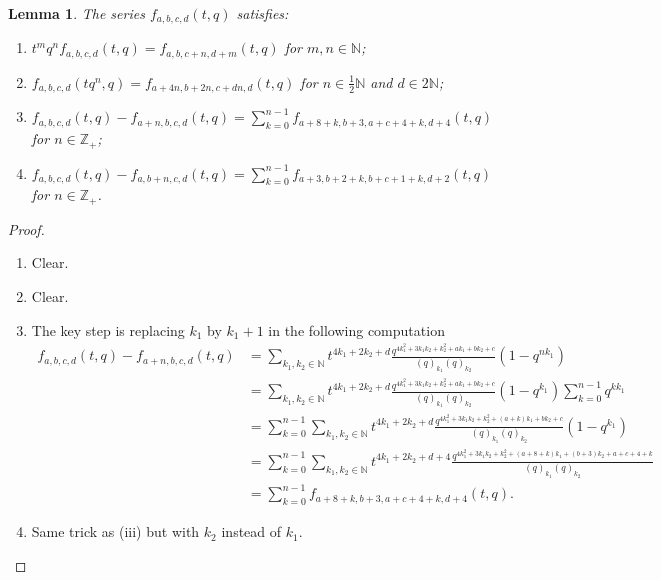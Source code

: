 \documentclass[a4paper, 12pt, reqno]{amsart}
\newtheorem{lemma}[theorem]{Lemma}
\theoremstyle{remark}
\begin{document}
\begin{lemma}
  \label{lmm:28}
  The series $f_{a, b, c, d}(t, q)$ satisfies:
  \begin{enumerate}
  \item $t^mq^nf_{a, b, c, d}(t, q) = f_{a, b, c + n, d + m}(t, q)$ for $m, n \in \mathbb{N}$;
  \item $f_{a, b, c, d}(tq^n, q) = f_{a + 4n, b + 2n, c + dn, d}(t, q)$ for $n \in \frac{1}{2}\mathbb{N}$ and $d \in 2\mathbb{N}$;
  \item $f_{a, b, c, d}(t, q) - f_{a + n, b, c, d}(t, q) = \sum_{k = 0}^{n - 1}f_{a + 8 + k, b + 3, a + c + 4 + k, d + 4}(t, q)$ for $n \in \mathbb{Z}_+$;
  \item $f_{a, b, c, d}(t, q) - f_{a, b + n, c, d}(t, q) = \sum_{k = 0}^{n - 1}f_{a + 3, b + 2 + k, b + c + 1 + k, d + 2}(t, q)$ for $n \in \mathbb{Z}_+$.
  \end{enumerate}
\end{lemma}

\begin{proof}\leavevmode
  \begin{enumerate}
  \item Clear.
  \item Clear.
  \item The key step is replacing $k_1$ by $k_1 + 1$ in the following computation
    \begin{align*}
      f_{a, b, c, d}(t, q) - f_{a + n, b, c, d}(t, q) &= \sum_{k_1, k_2 \in \mathbb{N}}t^{4k_1 + 2k_2 + d}\frac{q^{4k_1^2 + 3k_1k_2 + k_2^2 + ak_1 + bk_2 + c}}{(q)_{k_1}(q)_{k_2}}(1 - q^{nk_1}) \\
                                                      &= \sum_{k_1, k_2 \in \mathbb{N}}t^{4k_1 + 2k_2 + d}\frac{q^{4k_1^2 + 3k_1k_2 + k_2^2 + ak_1 + bk_2 + c}}{(q)_{k_1}(q)_{k_2}}(1 - q^{k_1})\sum_{k = 0}^{n - 1}q^{kk_1} \\
                                                      &= \sum_{k = 0}^{n - 1}\sum_{k_1, k_2 \in \mathbb{N}}t^{4k_1 + 2k_2 + d}\frac{q^{4k_1^2 + 3k_1k_2 + k_2^2 + (a + k)k_1 + bk_2 + c}}{(q)_{k_1}(q)_{k_2}}(1 - q^{k_1}) \\
                                                      &= \sum_{k = 0}^{n - 1}\sum_{k_1, k_2 \in \mathbb{N}}t^{4k_1 + 2k_2 + d + 4}\frac{q^{4k_1^2 + 3k_1k_2 + k_2^2 + (a + 8 + k)k_1 + (b + 3)k_2 + a + c + 4 + k}}{(q)_{k_1}(q)_{k_2}} \\
                                                      &= \sum_{k = 0}^{n - 1}f_{a + 8 + k, b + 3, a + c + 4 + k, d + 4}(t, q).
    \end{align*}
  \item Same trick as (iii) but with $k_2$ instead of $k_1$. \qedhere
  \end{enumerate}
\end{proof}
\end{document}
